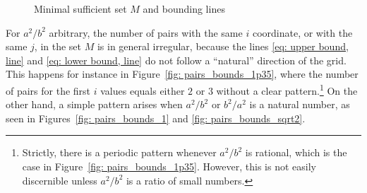 \documentclass[12pt, a4paper]{article}
\newcommand{\mss}{M}
\begin{document}
\begin{figure}
{}\hfill%
%
\caption{Minimal sufficient set $\mss$ and bounding lines
}%
\label{fig: pairs_bounds}%
\end{figure}%
 
For $a^2/b^2$ arbitrary, the number of pairs with the same $i$ coordinate, or with the same $j$, in the set $\mss$ is in general irregular, because the lines \eqref{eq: upper bound, line} and \eqref{eq: lower bound, line} do not follow a ``natural''
direction of the grid. This happens for instance in Figure~\ref{fig: pairs_bounds_1p35}, where the number of pairs for the first $i$ values equals either $2$ or $3$ without a clear pattern.\footnote{Strictly, there is a periodic pattern whenever $a^2/b^2$ is rational, which is the case in Figure~\ref{fig: pairs_bounds_1p35}. However, this is not easily discernible unless $a^2/b^2$ is a ratio of small numbers.}
On the other hand, a simple pattern arises when $a^2/b^2$ or $b^2/a^2$ is a natural number, as seen in Figures~\ref{fig: pairs_bounds_1} and \ref{fig: pairs_bounds_sqrt2}.
\end{document}

